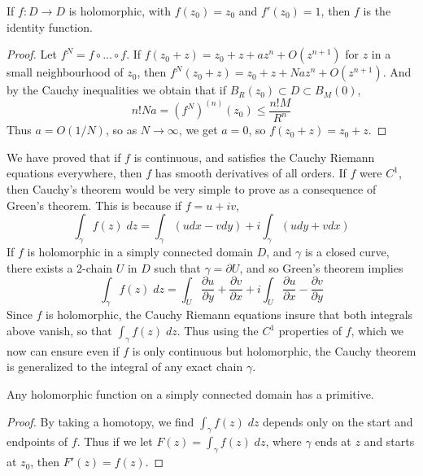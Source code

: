 \begin{corollary}
    If $f: D \to D$ is holomorphic, with $f(z_0) = z_0$ and $f'(z_0) = 1$, then $f$ is the identity function.
\end{corollary}
\begin{proof}
    Let $f^N = f \circ \dots \circ f$. If $f(z_0 + z) = z_0 + z + az^n + O(z^{n+1})$ for $z$ in a small neighbourhood of $z_0$, then $f^N(z_0 + z) = z_0 + z + Naz^n + O(z^{n+1})$. And by the Cauchy inequalities we obtain that if $B_R(z_0) \subset D \subset B_M(0)$,
    \[ n! Na = (f^N)^{(n)}(z_0) \leq \frac{n! M}{R^n} \]
    Thus $a = O(1/N)$, so as $N \to \infty$, we get $a = 0$, so $f(z_0 + z) = z_0 + z$.
\end{proof}

We have proved that if $f$ is continuous, and satisfies the Cauchy Riemann equations everywhere, then $f$ has smooth derivatives of all orders. If $f$ were $C^1$, then Cauchy's theorem would be very simple to prove as a consequence of Green's theorem. This is because if $f = u + iv$,
%
\[ \int_\gamma f(z)\; dz = \int_\gamma (u dx - v dy) + i \int_\gamma (u dy + v dx) \]
%
If $f$ is holomorphic in a simply connected domain $D$, and $\gamma$ is a closed curve, there exists a 2-chain $U$ in $D$ such that $\gamma = \partial U$, and so Green's theorem implies
%
\[ \int_\gamma f(z)\; dz = \int_U \frac{\partial u}{\partial y} + \frac{\partial v}{\partial x} + i \int_U \frac{\partial u}{\partial x} - \frac{\partial v}{\partial y} \]
%
Since $f$ is holomorphic, the Cauchy Riemann equations insure that both integrals above vanish, so that $\int_\gamma f(z)\; dz$. Thus using the $C^1$ properties of $f$, which we now can ensure even if $f$ is only continuous but holomorphic, the Cauchy theorem is generalized to the integral of any exact chain $\gamma$.

\begin{theorem}
    Any holomorphic function on a simply connected domain has a primitive.
\end{theorem}
\begin{proof}
    By taking a homotopy, we find $\int_\gamma f(z)\; dz$ depends only on the start and endpoints of $f$. Thus if we let $F(z) = \int_\gamma f(z)\; dz$, where $\gamma$ ends at $z$ and starts at $z_0$, then $F'(z) = f(z)$.
\end{proof}

